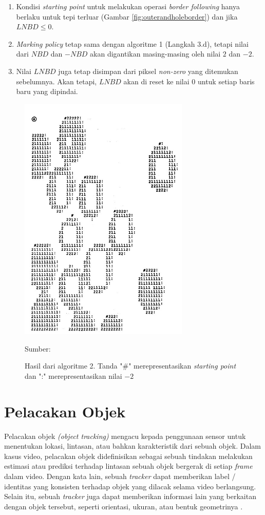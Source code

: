     \begin{enumerate}
        \item Kondisi \textit{starting point} untuk melakukan operasi \textit{border following} hanya berlaku untuk tepi terluar (Gambar \ref{fig:outerandholeborder}) dan jika $LNBD \leq 0$.
        \item \textit{Marking policy} tetap sama dengan algoritme 1 (Langkah 3.d), tetapi nilai dari $NBD$ dan $-NBD$ akan digantikan masing-masing oleh nilai $2$ dan  $-2$.
        \item Nilai $LNBD$ juga tetap disimpan dari piksel \textit{non-zero} yang ditemukan sebelumnya. Akan tetapi, $LNBD$ akan di reset ke nilai 0 untuk setiap baris baru yang dipindai.
    \end{enumerate}
    \vspace{-0.9cm}
    \begin{figure}[H]
    \centering
      \singlespacing
      \captionsetup{justification=centering,margin=0.5cm}
      \includegraphics[width=8.1cm]{image/algoritma2.jpg}
      \caption{Hasil dari algoritme 2. Tanda "\#" merepresentasikan \textit{starting point} dan ":" merepresentasikan nilai $-2$}
      \small{Sumber: \citep{Suzuki1985}}
      \label{fig:parentborder}
    \end{figure}
    
\section{Pelacakan Objek}
    Pelacakan objek \textit{(object tracking)} mengacu kepada penggunaan sensor untuk menentukan lokasi, lintasan, atau bahkan karakteristik dari sebuah objek. Dalam kasus video, pelacakan objek didefinisikan sebagai sebuah tindakan melakukan estimasi atau prediksi terhadap lintasan sebuah objek bergerak di setiap \textit{frame} dalam video. Dengan kata lain, sebuah \textit{tracker} dapat memberikan label / identitas yang konsisten terhadap objek yang dilacak selama video berlangsung. Selain itu, sebuah \textit{tracker} juga dapat memberikan informasi lain yang berkaitan dengan objek tersebut, seperti orientasi, ukuran, atau bentuk geometrinya \citep{Yilmaz2006}.
    

